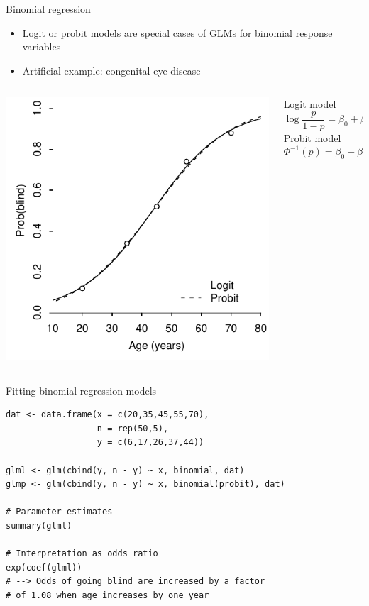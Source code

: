 \documentclass[aspectratio=169]{beamer}
\begin{document}
\begin{frame}{Binomial regression}
  \begin{itemize}
    \item Logit or probit models are special cases of GLMs for binomial
      response variables
    \item Artificial example: congenital eye disease
  \end{itemize}
\begin{columns}[c]
\begin{column}{6cm}
  \includegraphics[scale=.7]{../figures/glm}
\end{column}
\begin{column}{5cm}
Logit model
\[
  \log\frac{p}{1 - p} = \beta_0 + \beta_1 AGE
\]
Probit model
\[
  \Phi^{-1}(p) = \beta_0 + \beta_1 AGE
\]
\end{column}
\end{columns}
\end{frame}

\begin{frame}[fragile]{Fitting binomial regression models}
\begin{lstlisting}
dat <- data.frame(x = c(20,35,45,55,70),
                  n = rep(50,5),
                  y = c(6,17,26,37,44))

glml <- glm(cbind(y, n - y) ~ x, binomial, dat)
glmp <- glm(cbind(y, n - y) ~ x, binomial(probit), dat)

# Parameter estimates
summary(glml)

# Interpretation as odds ratio
exp(coef(glml))
# --> Odds of going blind are increased by a factor
# of 1.08 when age increases by one year
\end{lstlisting}
\end{frame}
\end{document}
